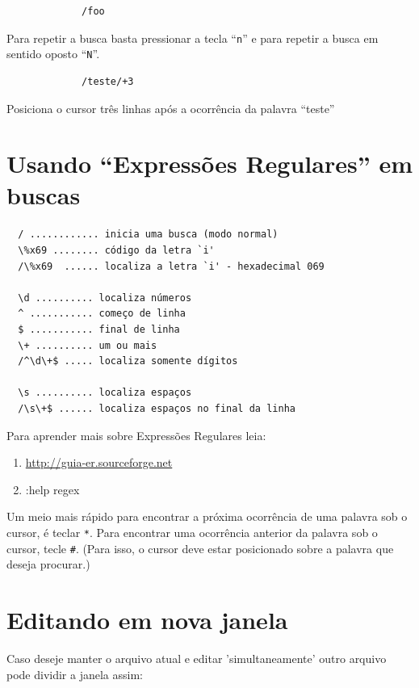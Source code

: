 \documentclass[10pt,a4paper,openany]{book}
\begin{document}
\begin{verbatim}
			 /foo
\end{verbatim}

Para repetir a busca basta pressionar a tecla ``\verb+n+'' e para
repetir a busca em sentido oposto ``\verb+N+''.

\begin{verbatim}
			 /teste/+3
\end{verbatim}

Posiciona o cursor três linhas após a ocorrência da palavra ``teste'' \\


\section{Usando ``Expressões Regulares'' em buscas}

\begin{verbatim}
  / ............ inicia uma busca (modo normal)
  \%x69 ........ código da letra `i'
  /\%x69  ...... localiza a letra `i' - hexadecimal 069

  \d .......... localiza números
  ^ ........... começo de linha
  $ ........... final de linha
  \+ .......... um ou mais
  /^\d\+$ ..... localiza somente dígitos

  \s .......... localiza espaços
  /\s\+$ ...... localiza espaços no final da linha 
\end{verbatim}

Para aprender mais sobre Expressões Regulares leia:

\begin{enumerate}
  \item \url{http://guia-er.sourceforge.net}
  \item :help regex
\end{enumerate}

Um meio mais rápido para encontrar a próxima ocorrência de
uma palavra sob o cursor, é teclar \verb|*|. Para encontrar uma ocorrência
anterior da palavra sob o cursor, tecle \verb|#|. (Para isso, o cursor deve
estar posicionado sobre a palavra que deseja procurar.)

\section{Editando em nova janela}\label{Editando em nova janela}

Caso deseje manter o arquivo atual e editar 'simultaneamente' outro arquivo
pode dividir a janela assim:
\end{document}
